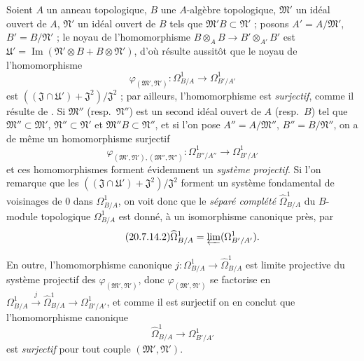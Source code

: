 \begin{env}[20.7.14]
\label{0.20.7.14-fr}
Soient $A$ un anneau topologique, $B$ une $A$-algèbre topologique,
$\mathfrak{M}'$ un idéal ouvert de $A$, $\mathfrak{N}'$ un idéal ouvert de
$B$ tels que $\mathfrak{M}'B\subset\mathfrak{N}'$ ; posons
$A'=A/\mathfrak{M}'$,
$B'=B/\mathfrak{N}'$ ; le noyau de l'homomorphisme
$B\otimes_A B\to B'\otimes_{A'}B'$ est
$\mathfrak{U}'=\operatorname{Im}(\mathfrak{N}'\otimes B+B\otimes\mathfrak{N}')$,
d'où résulte aussitôt que le noyau de l'homomorphisme
\begin{equation}
\tag{20.7.14.1}
\label{0.20.7.14.1-fr}
  \varphi_{(\mathfrak{M}',\mathfrak{N}')}:
  \Omega^1_{B/A}\to\Omega^1_{B'/A'}
\end{equation}
est $((\mathfrak{J}\cap\mathfrak{U}')+\mathfrak{J}^2)/\mathfrak{J}^2$ ; par
ailleurs, l'homomorphisme  est \emph{surjectif}, comme il
résulte de . Si $\mathfrak{M}''$ (resp.\
$\mathfrak{N}''$) est un second idéal ouvert de $A$ (resp.\ $B$) tel que
$\mathfrak{M}''\subset\mathfrak{M}'$, $\mathfrak{N}''\subset\mathfrak{N}'$
et $\mathfrak{M}''B\subset\mathfrak{N}''$, et si l'on pose
$A''=A/\mathfrak{M}''$, $B''=B/\mathfrak{N}''$, on a de même un
homomorphisme surjectif
\[
  \varphi_{(\mathfrak{M}',\mathfrak{N}'),(\mathfrak{M}'',\mathfrak{N}'')}:
  \Omega^1_{B''/A''}\to\Omega^1_{B'/A'}
\]
et ces homomorphismes forment évidemment un \emph{système projectif}. Si
l'on remarque que les
$((\mathfrak{J}\cap\mathfrak{U}')+\mathfrak{J}^2)/\mathfrak{J}^2$ forment
un système fondamental de voisinages de $0$ dans $\Omega^1_{B/A}$, on voit
donc que le \emph{séparé complété} $\widehat{\Omega}^1_{B/A}$ du $B$-module
topologique $\Omega^1_{B/A}$ est donné, à un isomorphisme canonique près, par
\begin{equation}
\tag{20.7.14.2}
\label{0.20.7.14.2-fr}
  \widehat{\Omega}^1_{B/A}=\varprojlim(\Omega^1_{B'/A'}).
\end{equation}

En outre, l'homomorphisme canonique
$j:\Omega^1_{B/A}\to\widehat{\Omega}^1_{B/A}$ est limite projective du
système projectif des $\varphi_{(\mathfrak{M}',\mathfrak{N}')}$, donc
$\varphi_{(\mathfrak{M}',\mathfrak{N}')}$ se factorise en
$\Omega^1_{B/A}\xrightarrow{j}\widehat{\Omega}^1_{B/A}\to
\Omega^1_{B'/A'}$, et comme il est surjectif on en conclut que
l'homomorphisme canonique
\begin{equation}
\tag{20.7.14.3}
\label{0.20.7.14.3-fr}
  \widehat{\Omega}^1_{B/A}\to\Omega^1_{B'/A'}
\end{equation}
est \emph{surjectif} pour tout couple $(\mathfrak{M}',\mathfrak{N}')$.


\end{env}
